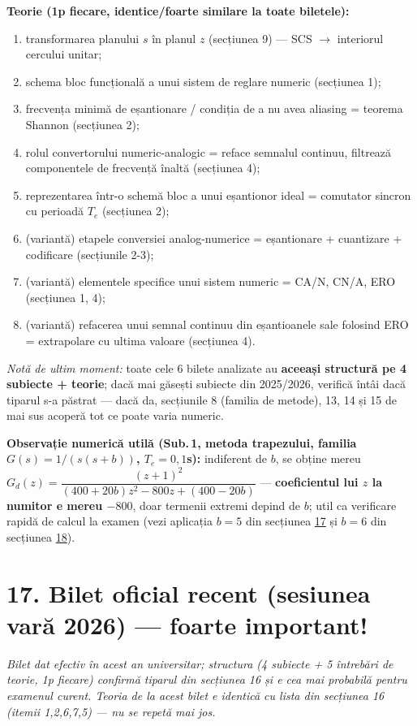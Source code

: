 \documentclass[10pt,a4paper]{article}
\begin{document}
\begin{keyeq}\color{red!65!black}
\textbf{Teorie (1p fiecare, identice/foarte similare la toate biletele):}
\begin{enumerate}
\item transformarea planului $s$ în planul $z$ (secțiunea 9) — SCS $\to$ interiorul cercului unitar;
\item schema bloc funcțională a unui sistem de reglare numeric (secțiunea 1);
\item frecvența minimă de eșantionare / condiția de a nu avea aliasing = teorema Shannon (secțiunea 2);
\item rolul convertorului numeric-analogic = reface semnalul continuu, filtrează componentele de frecvență înaltă (secțiunea 4);
\item reprezentarea într-o schemă bloc a unui eșantionor ideal = comutator sincron cu perioadă $T_e$ (secțiunea 2);
\item (variantă) etapele conversiei analog-numerice = eșantionare + cuantizare + codificare (secțiunile 2-3);
\item (variantă) elementele specifice unui sistem numeric = CA/N, CN/A, ERO (secțiunea 1, 4);
\item (variantă) refacerea unui semnal continuu din eșantioanele sale folosind ERO = extrapolare cu ultima valoare (secțiunea 4).
\end{enumerate}
\end{keyeq}

\textit{Notă de ultim moment:} toate cele 6 bilete analizate au \textbf{aceeași structură pe 4 subiecte + teorie}; dacă mai găsești subiecte din 2025/2026, verifică întâi dacă tiparul s-a păstrat — dacă da, secțiunile 8 (familia de metode), 13, 14 și 15 de mai sus acoperă tot ce poate varia numeric.

\textbf{Observație numerică utilă (Sub.\,1, metoda trapezului, familia $G(s)=1/(s(s+b))$, $T_e{=}0{,}1$s):} indiferent de $b$, se obține mereu $G_d(z)=\dfrac{(z+1)^2}{(400+20b)z^2-800z+(400-20b)}$ — \textbf{coeficientul lui $z$ la numitor e mereu $-800$}, doar termenii extremi depind de $b$; util ca verificare rapidă de calcul la examen (vezi aplicația $b{=}5$ din secțiunea \hyperref[sec:17]{17} și $b{=}6$ din secțiunea \hyperref[sec:18]{18}).

\section*{17. Bilet oficial recent (sesiunea vară 2026) — foarte important!}\label{sec:17}
\textit{Bilet dat efectiv în acest an universitar; structura (4 subiecte + 5 întrebări de teorie, 1p fiecare) confirmă tiparul din secțiunea 16 și e cea mai probabilă pentru examenul curent. Teoria de la acest bilet e identică cu lista din secțiunea 16 (itemii 1,2,6,7,5) — nu se repetă mai jos.}
\end{document}
